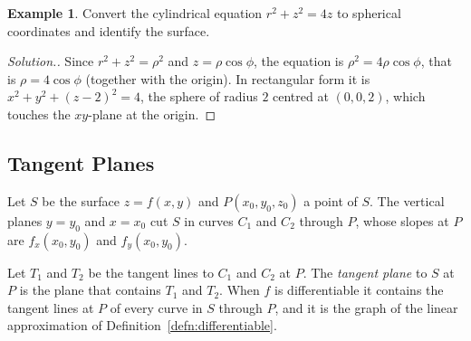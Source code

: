 \documentclass[11pt,a4paper]{article}
\theoremstyle{definition}
\newtheorem{exa}[thm]{Example}
\newenvironment{solution}
  {\renewcommand{\qedsymbol}{}\begin{proof}[\textit{Solution}.]}
  {\end{proof}}
\begin{document}
\begin{exa}
\label{ex:cyltosph}
Convert the cylindrical equation $r^2 + z^2 = 4z$ to spherical coordinates and
identify the surface.
\end{exa}

\begin{solution}
Since $r^2 + z^2 = \rho^2$ and $z = \rho\cos\phi$, the equation is
$\rho^2 = 4\rho\cos\phi$, that is $\rho = 4\cos\phi$ (together with the origin).
In rectangular form it is $x^2 + y^2 + (z-2)^2 = 4$, the sphere of radius $2$
centred at $(0,0,2)$, which touches the $xy$-plane at the origin.
\end{solution}

{\color[wave]{485}\subsection{Tangent Planes}}

Let $S$ be the surface $z = f(x,y)$ and $P(x_0,y_0,z_0)$ a point of $S$. The
vertical planes $y = y_0$ and $x = x_0$ cut $S$ in curves $C_1$ and $C_2$
through $P$, whose slopes at $P$ are $f_x(x_0,y_0)$ and $f_y(x_0,y_0)$.

\begin{figure}[H]
\centering
{}
\end{figure}

Let $T_1$ and $T_2$ be the tangent lines to $C_1$ and $C_2$ at $P$. The
\emph{tangent plane} to $S$ at $P$ is the plane that contains $T_1$ and $T_2$.
When $f$ is differentiable it contains the tangent lines at $P$ of every curve
in $S$ through $P$, and it is the graph of the linear approximation of
Definition~\ref{defn:differentiable}.
\end{document}
